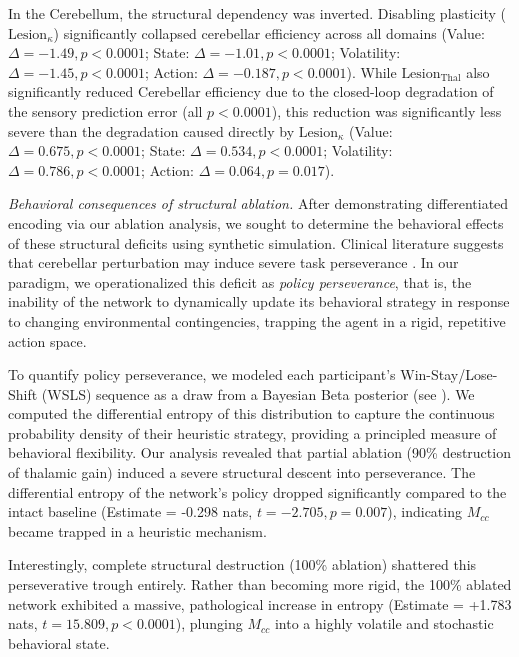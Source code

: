 \documentclass[12pt, a4paper]{extarticle}
\begin{document}
In the Cerebellum, the structural dependency was inverted. Disabling plasticity ($\text{Lesion}_{\kappa}$) significantly collapsed cerebellar efficiency across all domains (Value: $\Delta = -1.49, p < 0.0001$; State: $\Delta = -1.01, p < 0.0001$; Volatility: $\Delta = -1.45, p < 0.0001$; Action: $\Delta = -0.187, p < 0.0001$). While $\text{Lesion}_{\text{Thal}}$ also significantly reduced Cerebellar efficiency due to the closed-loop degradation of the sensory prediction error (all $p < 0.0001$), this reduction was significantly less severe than the degradation caused directly by $\text{Lesion}_{\kappa}$ (Value: $\Delta = 0.675, p < 0.0001$; State: $\Delta = 0.534, p < 0.0001$; Volatility: $\Delta = 0.786, p < 0.0001$; Action: $\Delta = 0.064, p = 0.017$).

\textit{Behavioral consequences of structural ablation.}
After demonstrating differentiated encoding via our ablation analysis, we sought to determine the behavioral effects of these structural deficits using synthetic simulation. Clinical literature suggests that cerebellar perturbation may induce severe task perseverance \parencite{schmahmannDysmetriaThoughtClinical1998a}. In our paradigm, we operationalized this deficit as \textit{policy perseverance}, that is, the inability of the network to dynamically update its behavioral strategy in response to changing environmental contingencies, trapping the agent in a rigid, repetitive action space.

To quantify policy perseverance, we modeled each participant's Win-Stay/Lose-Shift (WSLS) sequence as a draw from a Bayesian Beta posterior (see ). We computed the differential entropy of this distribution to capture the continuous probability density of their heuristic strategy, providing a principled measure of behavioral flexibility. Our analysis revealed that partial ablation (90\% destruction of thalamic gain) induced a severe structural descent into perseverance. The differential entropy of the network's policy dropped significantly compared to the intact baseline (Estimate = -0.298 nats, $t = -2.705, p = 0.007$), indicating $M_{cc}$ became trapped in a heuristic mechanism. 

Interestingly, complete structural destruction (100\% ablation) shattered this perseverative trough entirely. Rather than becoming more rigid, the 100\% ablated network exhibited a massive, pathological increase in entropy (Estimate = +1.783 nats, $t = 15.809, p < 0.0001$), plunging $M_{cc}$ into a highly volatile and stochastic behavioral state.
\end{document}
